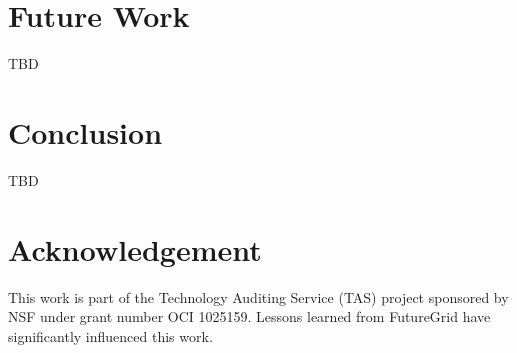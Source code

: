 \documentclass{sig-alternate}
\begin{document}
\section{Future Work}

TBD

\section{Conclusion}

TBD
 
 
\section*{Acknowledgement} 
 
This work is part of the Technology Auditing Service (TAS) project sponsored by NSF under grant number OCI 1025159. Lessons learned from FutureGrid have significantly influenced this work. 
 
 
%

% 
 
 
\end{document}
